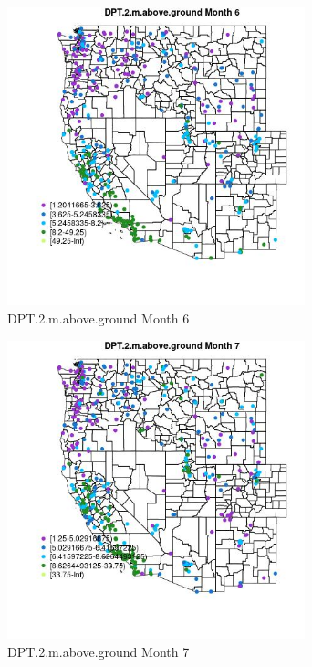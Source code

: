 \begin{figure} 
\centering  
\includegraphics[width=0.77\textwidth]{Code_Outputs/ML_input_report_ML_input_PM25_Step5_part_d_de_duplicated_aves_ML_input_MapObsMo6DPT2maboveground.jpg} 
\caption{\label{fig:ML_input_report_ML_input_PM25_Step5_part_d_de_duplicated_aves_ML_inputMapObsMo6DPT2maboveground}DPT.2.m.above.ground Month 6} 
\end{figure} 
 

\begin{figure} 
\centering  
\includegraphics[width=0.77\textwidth]{Code_Outputs/ML_input_report_ML_input_PM25_Step5_part_d_de_duplicated_aves_ML_input_MapObsMo7DPT2maboveground.jpg} 
\caption{\label{fig:ML_input_report_ML_input_PM25_Step5_part_d_de_duplicated_aves_ML_inputMapObsMo7DPT2maboveground}DPT.2.m.above.ground Month 7} 
\end{figure} 
 

